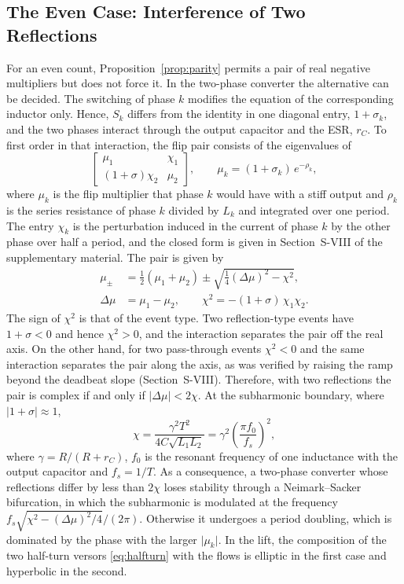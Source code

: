 \documentclass[journal]{IEEEtran}
\begin{document}
\subsection{The Even Case: Interference of Two Reflections}
\label{sec:par}
For an even count, Proposition~\ref{prop:parity} permits a pair of real
negative multipliers but does not force it. In the two-phase converter the
alternative can be decided. The switching of phase $k$ modifies the equation
of the corresponding inductor only. Hence, $S_k$ differs from the identity
in one diagonal entry, $1+\sigma_k$, and the two phases interact through the
output capacitor and the ESR, $r_C$. To first order in that interaction, the
flip pair consists of the eigenvalues of
\begin{equation}
\begin{bmatrix}\mu_1 & \chi_1\\ (1+\sigma)\chi_2 & \mu_2\end{bmatrix},
\qquad \mu_k=(1+\sigma_k)\,e^{-\rho_k},
\label{eq:bloque}
\end{equation}
where $\mu_k$ is the flip multiplier that phase $k$ would have with a stiff
output and $\rho_k$ is the series resistance of phase $k$ divided by $L_k$
and integrated over one period. The entry $\chi_k$ is the perturbation
induced in the current of phase $k$ by the other phase over half a period,
and the closed form is given in Section~S-VIII of the supplementary
material. The pair is given by
\begin{equation}
\begin{aligned}
\mu_{\pm}&=\tfrac12(\mu_1+\mu_2)\pm\sqrt{\tfrac14(\Delta\mu)^{2}-\chi^{2}},\\
\Delta\mu&=\mu_1-\mu_2,\qquad \chi^{2}=-(1+\sigma)\,\chi_1\chi_2 .
\end{aligned}
\label{eq:par}
\end{equation}
The sign of $\chi^{2}$ is that of the event type. Two reflection-type events
have $1+\sigma<0$ and hence $\chi^{2}>0$, and the interaction separates the
pair off the real axis. On the other hand, for two pass-through events $\chi^{2}<0$ and the same
interaction separates the pair along the axis, as was verified by raising
the ramp beyond the deadbeat slope (Section~S-VIII). Therefore, with
two reflections the pair is complex if and only if
$\lvert\Delta\mu\rvert<2\chi$. At the subharmonic boundary, where
$\lvert1+\sigma\rvert\approx1$,
\begin{equation}
\chi=\frac{\gamma^{2}T^{2}}{4C\sqrt{L_1L_2}}
=\gamma^{2}\left(\frac{\pi f_0}{f_s}\right)^{2},
\label{eq:chi0}
\end{equation}
where $\gamma=R/(R+r_C)$, $f_0$ is the resonant frequency of one inductance
with the output capacitor and $f_s=1/T$. As a consequence, a two-phase
converter whose reflections differ by less than $2\chi$ loses stability
through a Neimark--Sacker bifurcation, in which the subharmonic is modulated
at the frequency $f_s\sqrt{\chi^{2}-(\Delta\mu)^{2}/4}/(2\pi)$. Otherwise it
undergoes a period doubling, which is dominated by the phase with the larger
$\lvert\mu_k\rvert$. In the lift, the composition of the two half-turn
versors \eqref{eq:halfturn} with the flows is elliptic in the first case and
hyperbolic in the second.
\end{document}
